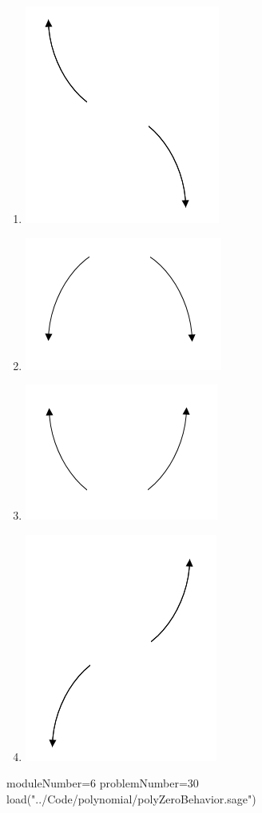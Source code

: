 \documentclass[14pt]{article}
\begin{document}
\begin{enumerate}
{\begin{multicols}{4}
	\begin{enumerate}[label=\Alph*.]
		\item \begin{center} \includegraphics[width=.2\textwidth]{../Figures/endBehaviorNegativeOddC} \end{center}
    \columnbreak
		\item \begin{center} \includegraphics[width=.2\textwidth]{../Figures/endBehaviorNegativeEvenC}\end{center}
    \columnbreak
		\item \begin{center} \includegraphics[width=.2\textwidth]{../Figures/endBehaviorPositiveEvenC}\end{center}
    \columnbreak
		\item \begin{center} \includegraphics[width=.2\textwidth]{../Figures/endBehaviorPositiveOddC}\end{center}
	\end{enumerate}
\end{multicols}
}

\begin{sagesilent}
moduleNumber=6
problemNumber=30
load("../Code/polynomial/polyZeroBehavior.sage")
\end{sagesilent}


\end{enumerate}
\end{document}

